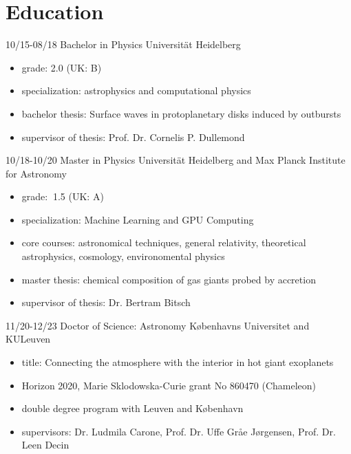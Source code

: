 \documentclass[]{friggeri-cv}
\begin{document}
\section{Education}
\begin{entrylist}
  \entry
    {10/15-08/18}
    {Bachelor in Physics}
    {Universität Heidelberg}
    {\begin{itemize}\vspace{-3mm}
    	\item grade: 2.0 (UK: B)
    	\item specialization: astrophysics and computational physics
    	\item bachelor thesis: Surface waves in protoplanetary disks induced by outbursts
    	\item supervisor of thesis: Prof. Dr. Cornelis P. Dullemond
    \end{itemize}
	}
  \entry
    {10/18-10/20}
    {Master in Physics}
    {Universität Heidelberg and Max Planck Institute for Astronomy}
    {\begin{itemize}\vspace{-3mm}
    	\item grade: $~$1.5 (UK: A)
    	\item specialization: Machine Learning and GPU Computing
    	\item core courses: astronomical techniques, general relativity, theoretical astrophysics, cosmology, environomental physics
    	\item master thesis: chemical composition of gas giants probed by accretion
    	\item supervisor of thesis: Dr. Bertram Bitsch
    \end{itemize}
    }
  \entry    
    {11/20-12/23}
    {Doctor of Science: Astronomy}
    {K{\o}benhavns Universitet and KULeuven}
    {\begin{itemize}\vspace{-3mm}
    \item title: Connecting the atmosphere with the interior in hot giant exoplanets
    \item Horizon 2020, Marie Sklodowska-Curie grant No 860470 (Chameleon)
    \item double degree program with Leuven and København
    \item supervisors: Dr. Ludmila Carone, Prof. Dr. Uffe Gråe Jørgensen, Prof. Dr. Leen Decin
    \end{itemize}    
	}
	\\
\end{entrylist}
\end{document}
